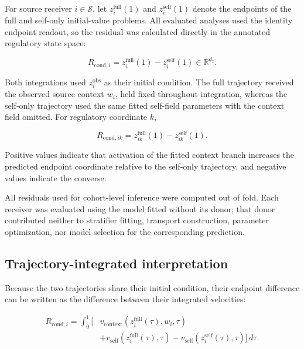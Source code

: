 For source receiver \(i\in\mathcal{S}\), let
\(z_i^{\mathrm{full}}(1)\) and \(z_i^{\mathrm{self}}(1)\) denote the endpoints
of the full and self-only initial-value problems. All evaluated analyses used
the identity endpoint readout, so the residual was calculated directly in the
annotated regulatory state space:

\begin{equation}
R_{\mathrm{cond},i}
=
z_i^{\mathrm{full}}(1)
-
z_i^{\mathrm{self}}(1)
\in
\mathbb{R}^{d_z}.
\label{eq:methods-rcond-identity}
\end{equation}

Both integrations used \(z_i^{\mathrm{obs}}\) as their initial condition. The
full trajectory received the observed source context \(w_i\), held fixed
throughout integration, whereas the self-only trajectory used the same fitted
self-field parameters with the context field omitted. For regulatory coordinate
\(k\),

\begin{equation}
R_{\mathrm{cond},ik}
=
z_{ik}^{\mathrm{full}}(1)
-
z_{ik}^{\mathrm{self}}(1).
\label{eq:methods-rcond-coordinate}
\end{equation}

Positive values indicate that activation of the fitted context branch increases
the predicted endpoint coordinate relative to the self-only trajectory, and
negative values indicate the converse.

All residuals used for cohort-level inference were computed out of fold. Each
receiver was evaluated using the model fitted without its donor; that donor
contributed neither to stratifier fitting, transport construction, parameter
optimization, nor model selection for the corresponding prediction.

\subsection{Trajectory-integrated interpretation}
\label{sec:methods-estimand-trajectory}

Because the two trajectories share their initial condition, their endpoint
difference can be written as the difference between their integrated
velocities:

\begin{equation}
\begin{aligned}
R_{\mathrm{cond},i}
=
\int_{0}^{1}
\Big[
&
v_{\mathrm{context}}
\left(
z_i^{\mathrm{full}}(\tau),
w_i,
\tau
\right)
\\
&+
v_{\mathrm{self}}
\left(
z_i^{\mathrm{full}}(\tau),
\tau
\right)
-
v_{\mathrm{self}}
\left(
z_i^{\mathrm{self}}(\tau),
\tau
\right)
\Big]
\,d\tau.
\end{aligned}
\label{eq:methods-rcond-decomposition}
\end{equation}

